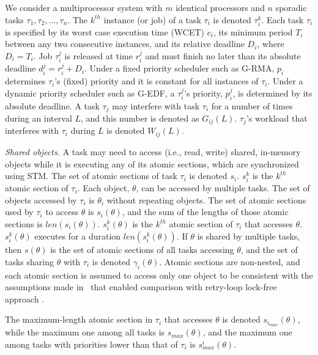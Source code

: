 \documentclass[conference]{IEEEtran}
\begin{document}
We consider a multiprocessor system with $m$ identical processors and $n$ sporadic tasks $\tau_1, \tau_2,\ldots, \tau_n$. The $k^{th}$ instance (or job) of a task $\tau_i$ is denoted $\tau_i^k$. Each task $\tau_i$ is specified by its worst case execution time (WCET) $c_i$, its minimum period $T_i$ between any two consecutive instances, and its relative deadline $D_i$, where $D_i=T_i$. Job $\tau_i^j$ is released at time $r_i^j$ and must finish no later than its absolute deadline $d_i^j=r_i^j+D_i$. Under a fixed priority scheduler such as G-RMA, $p_i$ determines $\tau_i$'s (fixed) priority and it is constant for all instances of $\tau_i$. Under a dynamic priority scheduler such as G-EDF, a $\tau_i^j$'s priority, $p_i^j$, is determined by its absolute deadline. 
A task $\tau_j$ may interfere with task $\tau_i$ for a number of times during an interval $L$, and this number is denoted as $G_{ij}(L)$. 
$\tau_j$'s workload that interferes with $\tau_i$ during $L$ is denoted $W_{ij}(L)$.


\textit{Shared objects.} A task may need to access (i.e., read, write) shared, in-memory objects while it is executing any of its atomic sections, which are synchronized using STM. 
The set of atomic sections of task $\tau_i$ is denoted $s_i$. $s_i^k$ is the $k^{th}$ atomic section of $\tau_i$. 
Each object, $\theta$, can be accessed by multiple tasks. The set of objects accessed by $\tau_i$ is $\theta_i$ without repeating objects.
The set of atomic sections used by $\tau_i$ to access $\theta$ is $s_i(\theta)$, and the sum of the lengths of those atomic sections is $len(s_i(\theta))$. $s_i^k(\theta)$ is the $k^{th}$ atomic section of $\tau_i$ that accesses $\theta$. $s_i^k(\theta)$  executes for a duration $len(s_i^k(\theta))$.
If $\theta$ is shared by multiple tasks, then $s(\theta)$ is the set of atomic sections of all tasks accessing $\theta$, and the set of tasks sharing $\theta$ with $\tau_i$ is denoted $\gamma_i(\theta)$. Atomic sections are non-nested, and each atomic section is assumed to access only one object to be consistent with the assumptions made in~\cite{stmconcurrencycontrol:emsoft11} that enabled comparison with retry-loop lock-free approach \cite{key-5}.

The maximum-length atomic section in $\tau_i$ that accesses $\theta$ is denoted $s_{i_{max}} (\theta)$, while the maximum one among all tasks is $s_{max} (\theta)$, and the maximum one among tasks with priorities lower than that of $\tau_i$ is $s_{max}^i (\theta)$.
\end{document}
